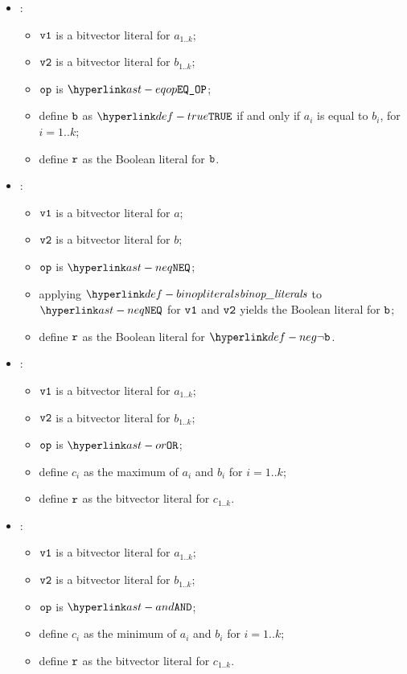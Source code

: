 \begin{itemize}
  \item {}:
  \begin{itemize}
    \item $\texttt{v1}$ is a bitvector literal for $a_{1..k}$;
    \item $\texttt{v2}$ is a bitvector literal for $b_{1..k}$;
    \item $\texttt{op}$ is $\EQOP$;
    \item define $\texttt{b}$ as $\True$ if and only if $a_i$ is equal to $b_i$, for $i=1..k$;
    \item define $\texttt{r}$ as the Boolean literal for $\texttt{b}$.
  \end{itemize}

  \item {}:
  \begin{itemize}
    \item $\texttt{v1}$ is a bitvector literal for $a$;
    \item $\texttt{v2}$ is a bitvector literal for $b$;
    \item $\texttt{op}$ is $\NEQ$;
    \item applying $\binopliterals$ to $\NEQ$ for $\texttt{v1}$ and $\texttt{v2}$ yields the Boolean literal for $\texttt{b}$\ProseOrTypeError;
    \item define $\texttt{r}$ as the Boolean literal for $\neg\vb$.
  \end{itemize}

  \item {}:
  \begin{itemize}
    \item $\texttt{v1}$ is a bitvector literal for $a_{1..k}$;
    \item $\texttt{v2}$ is a bitvector literal for $b_{1..k}$;
    \item $\texttt{op}$ is $\OR$;
    \item define $c_i$ as the maximum of $a_i$ and $b_i$ for $i=1..k$;
    \item define $\texttt{r}$ as the bitvector literal for $c_{1..k}$.
  \end{itemize}

  \item {}:
  \begin{itemize}
    \item $\texttt{v1}$ is a bitvector literal for $a_{1..k}$;
    \item $\texttt{v2}$ is a bitvector literal for $b_{1..k}$;
    \item $\texttt{op}$ is $\AND$;
    \item define $c_i$ as the minimum of $a_i$ and $b_i$ for $i=1..k$;
    \item define $\texttt{r}$ as the bitvector literal for $c_{1..k}$.
  \end{itemize}


\end{itemize}
